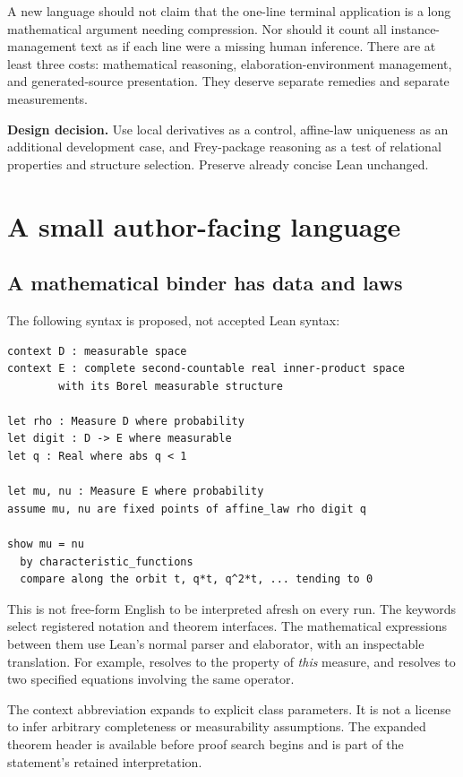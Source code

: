 \documentclass[11pt,a4paper]{article}
\newcommand{\code}[1]{\texttt{\detokenize{#1}}}
\newcommand{\result}[1]{\par\smallskip\textbf{Design decision.} #1\par\smallskip}
\theoremstyle{definition}
\begin{document}
A new language should not claim that the one-line terminal application is a
long mathematical argument needing compression. Nor should it count all
instance-management text as if each line were a missing human inference.
There are at least three costs: mathematical reasoning, elaboration-environment
management, and generated-source presentation. They deserve separate remedies
and separate measurements.

\result{Use local derivatives as a control, affine-law uniqueness as an
additional development case, and Frey-package reasoning as a test of relational
properties and structure selection. Preserve already concise Lean unchanged.}

\section{A small author-facing language}\label{sec:surface}
\subsection{A mathematical binder has data and laws}
The following syntax is proposed, not accepted Lean syntax:
\begin{lstlisting}
context D : measurable space
context E : complete second-countable real inner-product space
        with its Borel measurable structure

let rho : Measure D where probability
let digit : D -> E where measurable
let q : Real where abs q < 1

let mu, nu : Measure E where probability
assume mu, nu are fixed points of affine_law rho digit q

show mu = nu
  by characteristic_functions
  compare along the orbit t, q*t, q^2*t, ... tending to 0
\end{lstlisting}

This is not free-form English to be interpreted afresh on every run. The
keywords select registered notation and theorem interfaces. The mathematical
expressions between them use Lean's normal parser and elaborator, with an
inspectable translation. For example, \code{probability} resolves to the
property of \emph{this} measure, and \code{fixed points} resolves to two
specified equations involving the same operator.

The context abbreviation expands to explicit class parameters. It is not a
license to infer arbitrary completeness or measurability assumptions. The
expanded theorem header is available before proof search begins and is part
of the statement's retained interpretation.
\end{document}
